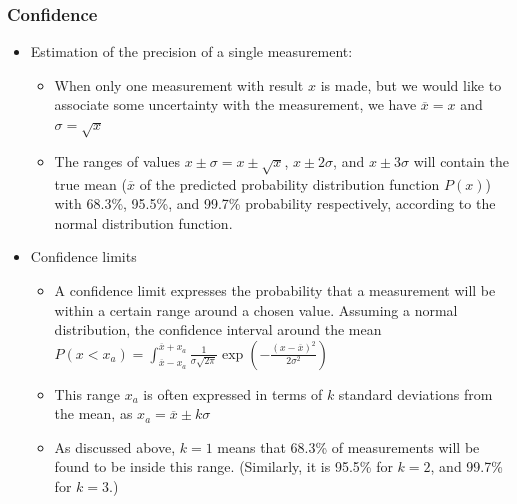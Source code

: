 \subsubsection{Confidence}
\begin{itemize}
    \item Estimation of the precision of a single measurement:
    \begin{itemize}
        \item When only one measurement with result $x$ is made, but we would like to associate some uncertainty with the measurement, we have $\overline{x}=x$ and $\sigma=\sqrt{x}$
        \item The ranges of values $x\pm\sigma=x\pm\sqrt{x}$, $x\pm2\sigma$, and $x\pm3\sigma$ will contain the true mean ($\overline{x}$ of the predicted probability distribution function $P(x)$) with 68.3\%, 95.5\%, and 99.7\% probability respectively, according to the normal distribution function. 
    \end{itemize}
    \item Confidence limits
    \begin{itemize}
        \item A confidence limit expresses the probability that a measurement will be within a certain range around a chosen value. Assuming a normal distribution, the confidence interval around the mean\\
        $P(x<x_a)=\int_{\overline{x}-x_a}^{\overline{x}+x_a}\frac{1}{\sigma\sqrt{2\pi}}\exp\left(-\frac{(x-\overline{x})^2}{2\sigma^2}\right)$
        \item This range $x_a$ is often expressed in terms of $k$ standard deviations from the mean, as $x_a=\overline{x}\pm k\sigma$
        \item As discussed above, $k=1$ means that 68.3\% of measurements will be found to be inside this range. (Similarly, it is 95.5\% for $k=2$, and 99.7\% for $k=3$.)
    \end{itemize}
\end{itemize}
